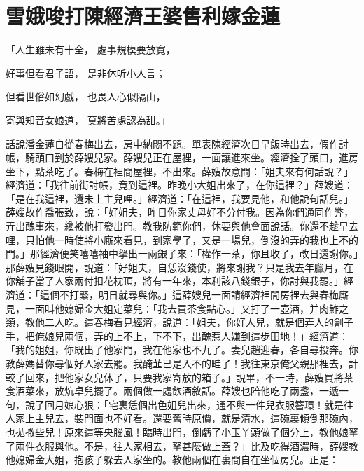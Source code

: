%

\chapter{雪娥唆打陳經濟\KG 王婆售利嫁金蓮}


\begin{showcontents}{}



「人生雖未有十全，  處事規模要放寬，

好事但看君子語，  是非休听小人言；

但看世俗如幻戲，  也畏人心似隔山，

寄與知音女娘道，  莫將苦處認為甜。」

話說潘金蓮自從春梅出去，房中納悶不題。單表陳經濟次日早飯時出去，假作討帳，騎頭口到於薛嫂兒家。薛嫂兒正在屋裡，一面讓進來坐。經濟拴了頭口，進房坐下，點茶吃了。春梅在裡間屋裡，不出來。薛嫂故意問：「姐夫來有何話說？」經濟道：「我往前街討帳，竟到這裡。昨晚小大姐出來了，在你這裡？」薛嫂道：「是在我這裡，還未上主兒哩。」經濟道：「在這裡，我要見他，和他說句話兒。」薛嫂故作喬張致，說：「好姐夫，昨日你家丈母好不分付我。因為你們通同作弊，弄出醜事來，纔被他打發出門。教我防範你們，休要與他會面說話。你還不趁早去哩，只怕他一時使將小廝來看見，到家學了，又是一場兒，倒沒的弄的我也上不的門。」那經濟便笑嘻嘻袖中拏出一兩銀子來：「權作一茶，你且收了，改日還謝你。」那薛嫂見錢眼開，說道：「好姐夫，自恁沒錢使，將來謝我？只是我去年臘月，在你舖子當了人家兩付扣花枕頂，將有一年來，本利該八錢銀子，你討與我罷。」經濟道：「這個不打緊，明日就尋與你。」這薛嫂兒一面請經濟裡間房裡去與春梅廝見，一面叫他媳婦金大姐定菜兒：「我去買茶食點心。」又打了一壺酒，并肉鮓之類，教他二人吃。這春梅看見經濟，說道：「姐夫，你好人兒，就是個弄人的劊子手，把俺娘兒兩個，弄的上不上，下不下，出醜惹人嫌到這步田地！」經濟道：「我的姐姐，你既出了他家門，我在他家也不九了。妻兒趙迎春，各自尋投奔。你教薛媽替你尋個好人家去罷。我醃韮已是入不的畦了！我往東京俺父親那裡去，計較了回來，把他家女兒休了，只要我家寄放的箱子。」說畢，不一時，薛嫂買將茶食酒菜來，放炕卓兒擺了。兩個做一處飲酒敘話。薛嫂也陪他吃了兩盞，一遞一句，說了回月娘心狠：「宅裏恁個出色姐兒出來，通不與一件兒衣服簪環！就是往人家上主兒去，裝門面也不好看。還要舊時原價，就是清水，這碗裏傾倒那碗內，也拋撒些兒！原來這等央腦風！臨時出門，倒虧了小玉丫頭做了個分上，教他娘拏了兩件衣服與他。不是，往人家相去，拏甚麼做上蓋？」比及吃得酒濃時，薛嫂教他媳婦金大姐，抱孩子躲去人家坐的。教他兩個在裏間自在坐個房兒。正是：


\end{showcontents}
